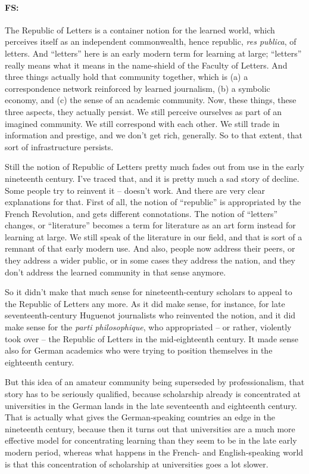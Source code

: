\documentclass[output=paper]{langscibook}
\begin{document}
\paragraph*{FS:}  The Republic of Letters is a container notion for the learned world, which perceives itself as an independent commonwealth, hence republic, \textit{res publica}, of letters. And “letters” here is an early modern term for learning at large; “letters” really means what it means in the name-shield of the Faculty of Letters. And three things actually hold that community together, which is (a) a correspondence network reinforced by learned journalism, (b) a symbolic economy, and (c) the sense of an academic community. Now, these things, these three aspects, they actually persist. We still perceive ourselves as part of an imagined community. We still correspond with each other. We still trade in information and prestige, and we don’t get rich, generally. So to that extent, that sort of infrastructure persists.

Still the notion of Republic of Letters pretty much fades out from use in the early nineteenth century. I’ve traced that, and it is pretty much a sad story of decline. Some people try to reinvent it – doesn’t work. And there are very clear explanations for that. First of all, the notion of “republic” is appropriated by the French Revolution, and gets different connotations. The notion of “letters” changes, or “literature” becomes a term for literature as an art form instead for learning at large. We still speak of the literature in our field, and that is sort of a remnant of that early modern use. And also, people now address their peers, or they address a wider public, or in some cases they address the nation, and they don’t address the learned community in that sense anymore. 

So it didn’t make that much sense for nineteenth-century scholars to appeal to the Republic of Letters any more. As it did make sense, for instance, for late seventeenth-century Huguenot journalists who reinvented the notion, and it did make sense for the \textit{parti philosophique}, who appropriated – or rather, violently took over – the Republic of Letters in the mid-eighteenth century. It made sense also for German academics who were trying to position themselves in the eighteenth century. 

But this idea of an amateur community being superseded by professionalism, that story has to be seriously qualified, because scholarship already is concentrated at universities in the German lands in the late seventeenth and eighteenth century. That is actually what gives the German-speaking countries an edge in the nineteenth century, because then it turns out that universities are a much more effective model for concentrating learning than they seem to be in the late early modern period, whereas what happens in the French- and English-speaking world is that this concentration of scholarship at universities goes a lot slower. 
\end{document}
